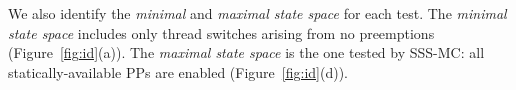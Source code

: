 We also identify the {\em minimal} and {\em maximal state space} for each test.
The {\em minimal state space} includes only thread switches arising from no preemptions (Figure~\ref{fig:id}(a)).
The {\em maximal state space} is the one tested by SSS-MC: all statically-available PPs are enabled (Figure~\ref{fig:id}(d)).
